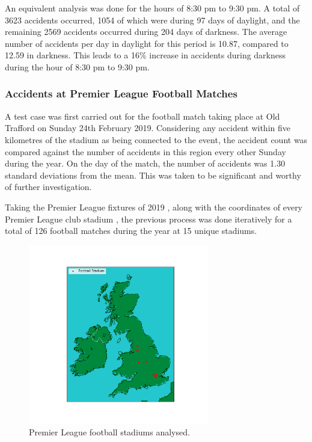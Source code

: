\documentclass[12pt]{article}
\begin{document}
An equivalent analysis was done for the hours of 8:30 pm to 9:30 pm. A total of 3623 accidents occurred, 1054 of which were during 97 days of daylight, and the remaining 2569 accidents occurred during 204 days of darkness. The average number of accidents per day in daylight for this period is 10.87, compared to 12.59 in darkness. This leads to a 16\% increase in accidents during darkness during the hour of 8:30 pm to 9:30 pm.

\subsubsection{Accidents at Premier League Football Matches}

A test case was first carried out for the football match taking place at Old Trafford on Sunday 24th February 2019. Considering any accident within five kilometres of the stadium as being connected to the event, the accident count was compared against the number of accidents in this region every other Sunday during the year. On the day of the match, the number of accidents was 1.30 standard deviations from the mean. This was taken to be significant and worthy of further investigation.

Taking the Premier League fixtures of 2019 \parencite{fixtures}, along with the coordinates of every Premier League club stadium \parencite{stadiums}, the previous process was done iteratively for a total of 126 football matches during the year at 15 unique stadiums.

\begin{figure}[h]
\centering     %
\includegraphics[width=0.70\textwidth]{stadiums}
\caption{Premier League football stadiums analysed.}
\end{figure}
\end{document}
